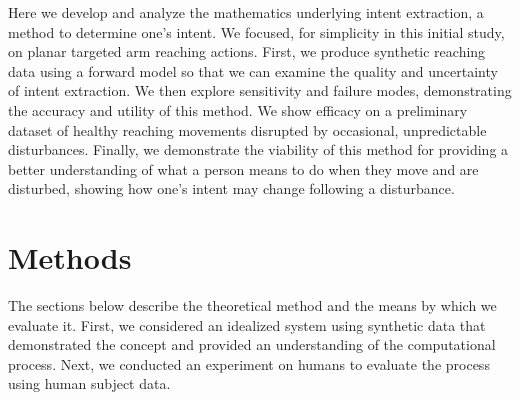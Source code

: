 \documentclass[10pt]{article}
\begin{document}
Here we develop and analyze the mathematics underlying intent extraction, a method to determine one's intent. We focused, for simplicity in this initial study, on planar targeted arm reaching actions. First, we produce synthetic reaching data using a forward model so that we can examine the quality and uncertainty of intent extraction. We then explore sensitivity and failure modes, demonstrating the accuracy and utility of this method. We show efficacy on a preliminary dataset of healthy reaching movements disrupted by occasional, unpredictable disturbances. Finally, we demonstrate the viability of this method for providing a better understanding of what a person means to do when they move and are disturbed, showing how one's intent may change following a disturbance. 



\section*{Methods}
The sections below describe the theoretical method and the means by which we evaluate it. First, we considered an idealized system using synthetic data that demonstrated the concept and provided an understanding of the computational process. Next, we conducted an experiment on humans to evaluate the process using human subject data. 
\end{document}
